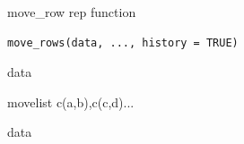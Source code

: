 \documentclass[a4paper]{book}
\begin{document}
%
\begin{Description}
move\_row rep function
\end{Description}
%
\begin{Usage}
\begin{verbatim}
move_rows(data, ..., history = TRUE)
\end{verbatim}
\end{Usage}
%
\begin{Arguments}
\begin{ldescription}
\item[\code{data}] data

\item[\code{...}] movelist c(a,b),c(c,d)...
\end{ldescription}
\end{Arguments}
%
\begin{Value}
data
\end{Value}
%
\end{document}
